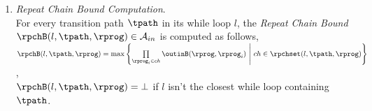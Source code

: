\begin{enumerate}
%
%
\item  \emph{Repeat Chain Bound Computation}.
\\
For every transition path $\tpath$
in its  while loop $l$,
the \emph{Repeat Chain Bound} $\rpchB(l, \tpath, \rprog) \in \mathcal{A}_{in}$ is computed as follows,
  \\
  $\rpchB(l, \tpath, \rprog) = \max \left\{ \prod\limits_{\rprog_i \in ch}  \outinB(\rprog, \rprog_i) 
  ~\middle\vert~ ch \in \rpchset(l, \tpath, \rprog) \right\}
  $,
  \\
  $\rpchB(l, \tpath, \rprog) = \bot$ if $l$ isn't the closest while loop containing $\tpath$.
  \end{enumerate}
